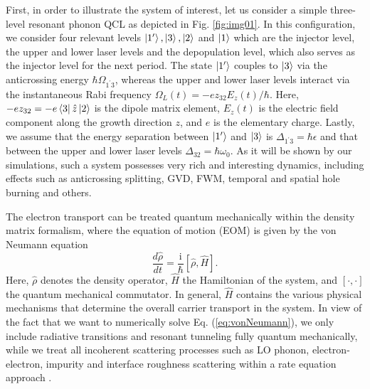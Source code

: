 \documentclass[10pt,letterpaper]{article}%
\begin{document}
First, in order to illustrate the system of interest, let us consider a simple
three-level resonant phonon QCL as depicted in Fig. \ref{fig:img01}. In this
configuration, we consider four relevant levels $\Ket{1'},\Ket{3},\Ket{2}$ and
$\Ket{1}$ which are the injector level, the upper and lower laser levels and
the depopulation level, which also serves as the injector level for the next
period. The state $\Ket{1'}$ couples to $\Ket{3}$ via the anticrossing energy
$\hbar\Omega_{1^{\prime}3}$, whereas the upper and lower laser levels interact
via the instantaneous Rabi frequency $\Omega_{L}(t)=-ez_{32}E_{z}(t)/\hbar$.
Here, $-ez_{32}=-e\Bra{3}\hat{z}\Ket{2}$ is the dipole matrix element,
$E_{z}(t)$ is the electric field component along the growth direction $z$, and
$e$ is the elementary charge. Lastly, we assume that the energy separation
between $\Ket{1'}$ and $\Ket{3}$ is $\Delta_{1^{\prime}3}=\hbar\epsilon$ and
that between the upper and lower laser levels $\Delta_{32}=\hbar\omega_{0}$.
As it will be shown by our simulations, such a system possesses very rich and
interesting dynamics, including effects such as anticrossing splitting, GVD,
FWM, temporal and spatial hole burning and others.

The electron transport can be treated quantum mechanically within the density
matrix formalism, where the equation of motion (EOM) is given by the von
Neumann equation
\begin{equation}
\frac{d\hat{\rho}}{dt}=\frac{\mathrm{i}}{\hbar}[\hat{\rho},\hat{H}].
\label{eq:vonNeumann}%
\end{equation}
Here, $\hat{\rho}$ denotes the density operator, $\hat{H}$ the Hamiltonian of
the system, and $[\cdot,\cdot]$ the quantum mechanical commutator. In general,
$\hat{H}$ contains the various physical mechanisms that determine the overall
carrier transport in the system. In view of the fact that we want to
numerically solve Eq. (\ref{eq:vonNeumann}), we only include radiative
transitions and resonant tunneling fully quantum mechanically, while we treat
all incoherent scattering processes such as LO phonon, electron-electron,
impurity and interface roughness scattering within a rate equation approach
\cite{jirauschek2014modeling,iotti2005microscopic}.
\end{document}
